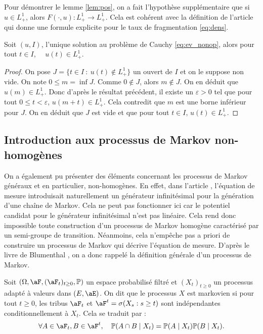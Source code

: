 \begin{rem}
	Pour démontrer le lemme \ref{lem:pos}, on a fait l'hypothèse supplémentaire que si $u \in L^1_+$, alors $F(\cdot , u) : L^1_+ \to L^1_+$. Cela est cohérent avec la définition de l'article \cite{geo} qui donne une formule explicite pour le taux de fragmentation \ref{eq:dens}.
\end{rem}

\begin{prop}{}{}
	Soit $(u,I)$, l'unique solution au problème de Cauchy \ref{eq:ev_nonop}, alors pour tout $t \in I$, $\quad u(t) \in L^1_+$.
\end{prop}

\begin{proof}
	On pose $J = \{t \in I \ : \ u(t) \notin L^1_+\}$ un ouvert de $I$ et on le suppose non vide. On note $0 \le m = \inf J$. Comme $0 \notin J$, alors $m \notin J$.
	On en déduit que $u(m) \in L^1_+$. Donc d'après le résultat précédent, il existe un $\varepsilon > 0$ tel que pour tout $0 \le  t < \varepsilon$,
	$u(m + t) \in L^1_+$. Cela contredit que $m$ est une borne inférieur pour $J$. On en déduit que $J$ est vide et que pour tout $t\in I$, $u(t) \in L^1_+$.
\end{proof}

\subsection{Introduction aux processus de Markov non-homogènes}

On a également pu présenter des éléments concernant les processus de Markov généraux et en particulier, non-homogènes. En effet, dans l'article \cite{frag_deaconu}, l'équation
de mesure introduisait naturellement un générateur infinitésimal pour la génération d'une chaîne de Markov. Cela ne peut pas fonctionner ici car le potentiel candidat pour le \og générateur infinitésimal \fg{} n'est pas linéaire.
Cela rend donc impossible toute construction d'un processus de Markov homogène caractérisé par un semi-groupe de transition.
Néanmoins, cela n'empêche pas a priori de construire un processus de Markov qui décrive l'équation de mesure. D'après le livre de Blumenthal \cite{blumenthal}, on a donc rappelé la définition générale d'un processus de Markov.

\begin{defn}{}{}
	Soit $(\Omega, \aF, (\aF_t)_{t \ge 0}, \mathbb{P})$ un espace probabilisé filtré et $(X_t)_{t \ge 0}$ un processus adapté à valeurs dans $(E, \aE)$. On dit que le processus $X$ est markovien
	si pour tout $t \ge 0$, les tribus $\aF_t$ et $\aF^t =\sigma(X_s : s \ge t)$ sont indépendantes conditionnellement à $X_t$. Cela se traduit par :
	\[
		\forall A \in \aF_t, B \in \aF^t, \quad \mathbb{P}(A \cap B \mid X_t) =  \mathbb{P}(A \mid X_t) \mathbb{P}(B \mid X_t).
	\]
\end{defn}

